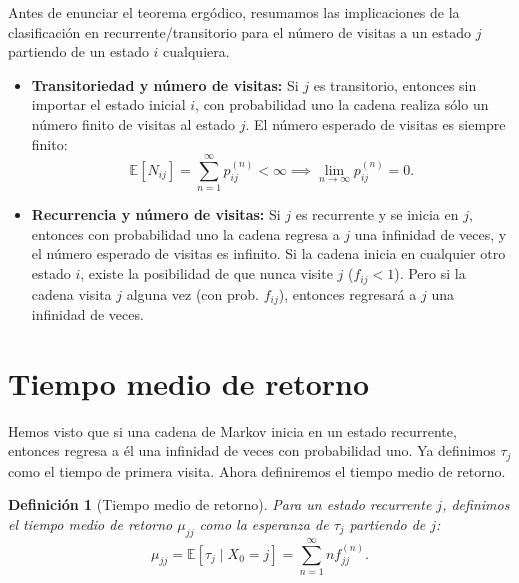 \documentclass[12pt]{book}
\newtheorem{definition}{Definición}[chapter]
\begin{document}
Antes de enunciar el teorema ergódico, resumamos las implicaciones de la clasificación en recurrente/transitorio para el número de visitas a un estado $j$ partiendo de un estado $i$ cualquiera.

\begin{itemize}
    \item \textbf{Transitoriedad y número de visitas:} Si $j$ es transitorio, entonces sin importar el estado inicial $i$, con probabilidad uno la cadena realiza sólo un número finito de visitas al estado $j$. El número esperado de visitas es siempre finito:
    \[ \mathbb{E}[N_{ij}] = \sum_{n=1}^\infty p_{ij}^{(n)} < \infty \implies \lim_{n \to \infty} p_{ij}^{(n)} = 0. \]
    
    \item \textbf{Recurrencia y número de visitas:} Si $j$ es recurrente y se inicia en $j$, entonces con probabilidad uno la cadena regresa a $j$ una infinidad de veces, y el número esperado de visitas es infinito. Si la cadena inicia en cualquier otro estado $i$, existe la posibilidad de que nunca visite $j$ ($f_{ij} < 1$). Pero si la cadena visita $j$ alguna vez (con prob. $f_{ij}$), entonces regresará a $j$ una infinidad de veces.
\end{itemize}

\section{Tiempo medio de retorno}

Hemos visto que si una cadena de Markov inicia en un estado recurrente, entonces regresa a él una infinidad de veces con probabilidad uno. Ya definimos $\tau_j$ como el tiempo de primera visita. Ahora definiremos el tiempo medio de retorno.

\begin{definition}[Tiempo medio de retorno]
Para un estado recurrente $j$, definimos el tiempo medio de retorno $\mu_{jj}$ como la esperanza de $\tau_j$ partiendo de $j$:
\[
\mu_{jj} = \mathbb{E}[\tau_j \mid X_0 = j] = \sum_{n=1}^\infty n f_{jj}^{(n)}.
\]
\end{definition}
\end{document}
